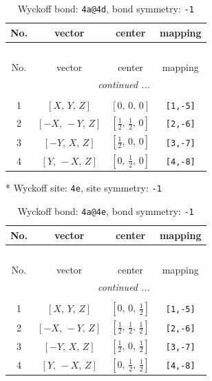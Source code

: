\documentclass[fleqn,8pt]{jsarticle}
\begin{document}
\begin{longtable}{cccc}
\caption{Wyckoff bond: {\tt 4a@4d}, bond symmetry: {\tt -1}}
 \\
 \hline \hline
No. & vector & center & mapping \\ \hline \endfirsthead

\multicolumn{3}{l}{\tablename\ \thetable{}} \\
 \hline \hline
No. & vector & center & mapping \\ \hline \endhead

 \hline \hline
\multicolumn{3}{r}{\footnotesize\it continued ...} \\ \endfoot

 \hline \hline
\multicolumn{3}{r}{} \\ \endlastfoot

1 & $\left[ X,\, Y,\, Z \right]$ & $\left[ 0,\, 0,\, 0 \right]$ & {\tt [1,-5]} \\ \hline
2 & $\left[ - X,\, - Y,\, Z \right]$ & $\left[ \frac{1}{2},\, \frac{1}{2},\, 0 \right]$ & {\tt [2,-6]} \\ \hline
3 & $\left[ - Y,\, X,\, Z \right]$ & $\left[ \frac{1}{2},\, 0,\, 0 \right]$ & {\tt [3,-7]} \\ \hline
4 & $\left[ Y,\, - X,\, Z \right]$ & $\left[ 0,\, \frac{1}{2},\, 0 \right]$ & {\tt [4,-8]} \\
\end{longtable}
* Wyckoff site: {\tt 4e}, site symmetry: {\tt -1}
\renewcommand{\arraystretch}{1.2}
\begin{longtable}{cccc}
\caption{Wyckoff bond: {\tt 4a@4e}, bond symmetry: {\tt -1}}
 \\
 \hline \hline
No. & vector & center & mapping \\ \hline \endfirsthead

\multicolumn{3}{l}{\tablename\ \thetable{}} \\
 \hline \hline
No. & vector & center & mapping \\ \hline \endhead

 \hline \hline
\multicolumn{3}{r}{\footnotesize\it continued ...} \\ \endfoot

 \hline \hline
\multicolumn{3}{r}{} \\ \endlastfoot

1 & $\left[ X,\, Y,\, Z \right]$ & $\left[ 0,\, 0,\, \frac{1}{2} \right]$ & {\tt [1,-5]} \\ \hline
2 & $\left[ - X,\, - Y,\, Z \right]$ & $\left[ \frac{1}{2},\, \frac{1}{2},\, \frac{1}{2} \right]$ & {\tt [2,-6]} \\ \hline
3 & $\left[ - Y,\, X,\, Z \right]$ & $\left[ \frac{1}{2},\, 0,\, \frac{1}{2} \right]$ & {\tt [3,-7]} \\ \hline
4 & $\left[ Y,\, - X,\, Z \right]$ & $\left[ 0,\, \frac{1}{2},\, \frac{1}{2} \right]$ & {\tt [4,-8]} \\
\end{longtable}
\end{document}
